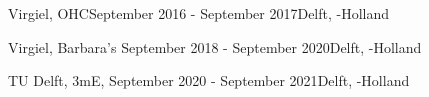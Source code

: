 \begin{rSection}{}
  \begin{experienceItem}{Virgiel, OHC}{September 2016 - September 2017}{}{Delft, -Holland}
  \end{experienceItem}

  \begin{experienceItem}{Virgiel, Barbara's }{September 2018 - September 2020}{}{Delft, -Holland}
  \end{experienceItem}

  \begin{experienceItem}
    {TU Delft, 3mE, }{September 2020 - September 2021}{}{Delft, -Holland}
  \end{experienceItem}

\end{rSection}



